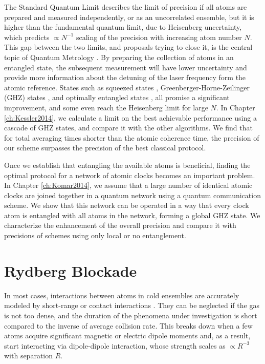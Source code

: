 The Standard Quantum Limit describes the limit of precision if all atoms are
prepared and measured independently, or as an uncorrelated ensemble, but it is
higher than the fundamental quantum limit, due to Heisenberg uncertainty, which
predicts $\propto N^{-1}$ scaling of the precision with increasing atom number
$N$. This gap between the two limits, and proposals trying to close it, is the
central topic of Quantum Metrology \cite{Giovanetti2011, Escher:2011fn}. By
preparing the collection of atoms in an entangled state, the subsequent
measurement will have lower uncertainty and provide more information about the
detuning of the laser frequency form the atomic reference. States such as
squeezed states \cite{Andre2004, Borregaard2013_nearHeisenberg},
Greenberger-Horne-Zeilinger (GHZ) states \cite{Wineland1998, Bollinger1996}, and
optimally entangled states \cite{Buzek1999, Berry2009}, all promise a
significant improvement, and some even reach the
Heisenberg limit for large $N$. In Chapter \ref{ch:Kessler2014}, we calculate
a limit on the best achievable performance using a cascade of GHZ states, and
compare it with the other algorithms. We find that for total averaging
times shorter than the atomic coherence time, the precision of our scheme
surpasses the precision of the best classical protocol.

Once we establish that entangling the available atoms is beneficial, finding the
optimal protocol for a network of atomic clocks becomes an important problem. In
Chapter \ref{ch:Komar2014}, we assume that a large number of identical atomic
clocks are joined together in a quantum network using a quantum communication
scheme. We show that this network can be operated in a way that every clock
atom is entangled with all atoms in the network, forming a global
GHZ state. We characterize the enhancement of the overall precision and compare
it with precisions of schemes using only local or no entanglement.





\section{Rydberg Blockade}
In most cases, interactions between atoms in cold ensembles are accurately
modeled by short-range or contact interactions \cite{Cheng2010}.
They can be neglected if the gas is not too dense, and the duration of the
phenomena under investigation is short compared to the inverse of average
collision rate. This breaks down when a few atoms acquire significant magnetic
or electric dipole moments and, as a result, start interacting via dipole-dipole
interaction, whose strength scales as $\propto R^{-3}$ with separation $R$.


